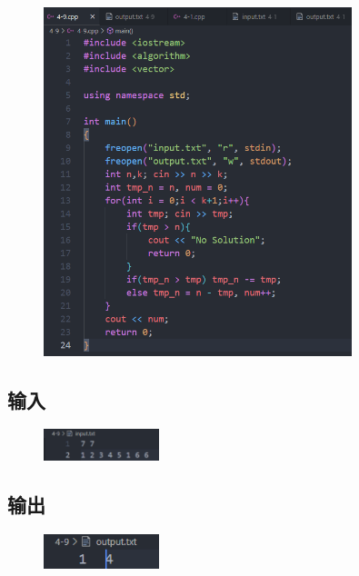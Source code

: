\documentclass[11pt]{article}  %
\begin{document}
    \begin{figure}[H]
        \centering
        \includegraphics[width = 0.8\textwidth]{pic/4-9.png}
    \end{figure}

\subsection*{输入}

    \begin{figure}[H]
        \centering
        \includegraphics[width = 0.3\textwidth]{pic/4-9in.png}
    \end{figure}

\subsection*{输出}

    \begin{figure}[H]
        \centering
        \includegraphics[width = 0.3\textwidth]{pic/4-9out.png}
    \end{figure}
\end{document}
